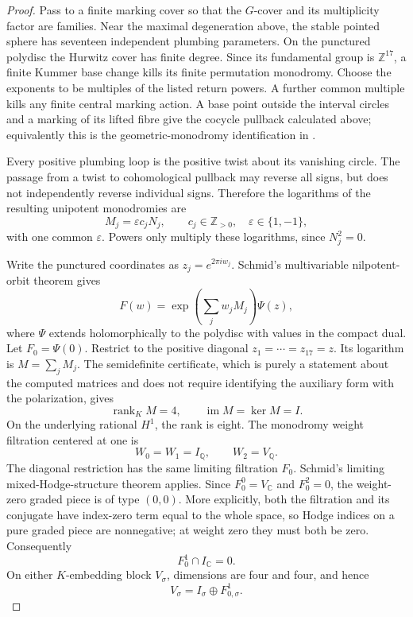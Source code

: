 \begin{proof}
Pass to a finite marking cover so that the \(G\)-cover and its multiplicity
factor are families.  Near the maximal degeneration above, the stable pointed
sphere has seventeen independent plumbing parameters.  On the punctured
polydisc the Hurwitz cover has finite degree.  Since its fundamental group
is \(\mathbb Z^{17}\), a finite Kummer base change kills its finite
permutation monodromy.  Choose the exponents to be multiples of the listed
return powers.  A further common multiple kills any finite central marking
action.  A base point outside the interval circles and a marking of its lifted
fibre give the cocycle pullback calculated above; equivalently this is the
geometric-monodromy identification in
\cite[Lemma 2.2 and Theorem 2.5]{G34:DWmon}.

Every positive plumbing loop is the positive twist about its vanishing
circle.  The passage from a twist to cohomological pullback may reverse all
signs, but does not independently reverse individual signs.  Therefore the
logarithms of the resulting unipotent monodromies are
\[
                        M_j=\varepsilon c_jN_j,
             \qquad c_j\in\mathbb Z_{>0},\quad\varepsilon\in\{1,-1\},
\]
with one common \(\varepsilon\).  Powers only multiply these logarithms,
since \(N_j^2=0\).

Write the punctured coordinates as \(z_j=e^{2\pi i w_j}\).
Schmid's multivariable nilpotent-orbit theorem
\cite[Theorem (4.12), p.~233]{G34:Schmid} gives
\[
              F(w)=\exp\!\left(\sum_j w_jM_j\right)\Psi(z),
\]
where \(\Psi\) extends holomorphically to the polydisc with values in the
compact dual.  Let \(F_0=\Psi(0)\).  Restrict to the positive diagonal
\(z_1=\cdots=z_{17}=z\).  Its logarithm is \(M=\sum_jM_j\).
The semidefinite certificate, which is purely a statement about the computed
matrices and does not require identifying the auxiliary form with the
polarization, gives
\[
              \operatorname{rank}_K M=4,\qquad
                         \operatorname{im}M=\ker M=I.
\]
On the underlying rational \(H^1\), the rank is eight.  The monodromy weight
filtration centered at one is
\[
                 W_0=W_1=I_{\mathbb Q},\qquad W_2=V_{\mathbb Q}.
\]
The diagonal restriction has the same limiting filtration \(F_0\).
Schmid's limiting mixed-Hodge-structure theorem
\cite[Theorem (6.16), p.~255]{G34:Schmid} applies.  Since
\(F_0^0=V_{\mathbb C}\) and \(F_0^2=0\), the weight-zero graded piece is
of type \((0,0)\).  More explicitly, both the filtration and its conjugate
have index-zero term equal to the whole space, so Hodge indices on a pure
graded piece are nonnegative; at weight zero they must both be zero.
Consequently
\[
                     F_0^1\cap I_{\mathbb C}=0.
\]
On either \(K\)-embedding block \(V_\sigma\), dimensions are four and four,
and hence
\[
                         V_\sigma=I_\sigma\oplus F_{0,\sigma}^1.
\]


\end{proof}
